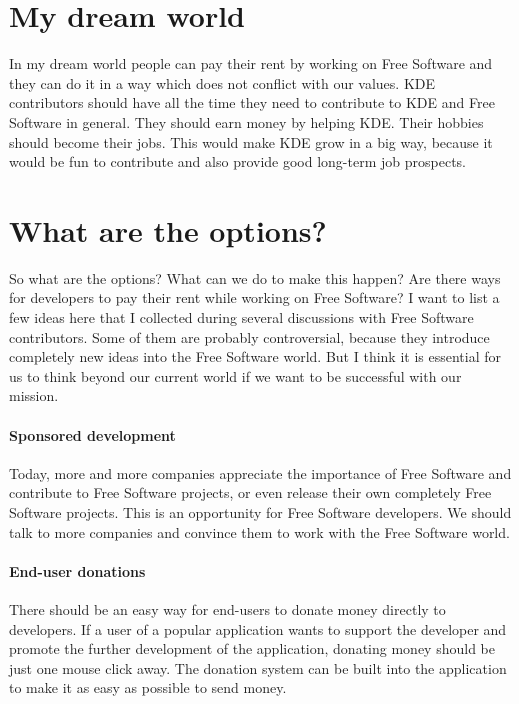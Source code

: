 \section*{My dream world}

In my dream world people can pay their rent by working on Free Software and
they can do it in a way which does not conflict with our values.
KDE contributors should have all the time they need to contribute to KDE and
Free Software in general. They should earn money by helping KDE. Their hobbies
should become their jobs. This would make KDE grow in a big way, because it
would be fun to contribute and also provide good long-term job prospects.  

\section*{What are the options?}

So what are the options? What can we do to make this happen? Are there ways for
developers to pay their rent while working on Free Software? I want to list a
few ideas here that I collected during several discussions with Free Software
contributors. Some of them are probably controversial, because they introduce
completely new ideas into the Free Software world. But I think it is essential
for us to think beyond our current world if we want to be successful with our
mission.  

\paragraph*{Sponsored development}

Today, more and more companies appreciate the importance of Free Software and
contribute to Free Software projects, or even release their own completely Free
Software projects. This is an opportunity for Free Software developers. We
should talk to more companies and convince them to work with the Free Software
world. 

\paragraph*{End-user donations}

There should be an easy way for end-users to donate money directly to
developers. If a user of a popular application wants to support the developer
and promote the further development of the application, donating money should be
just one mouse click away. The donation system can be built into the application
to make it as easy as possible to send money.


